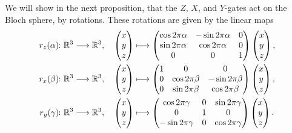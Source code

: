 \documentclass[a4paper, oneside, 12pt]{amsart}
\begin{document}
We will show in the next proposition, that the \( Z \), \( X \), and \( Y \)-gates act on the Bloch sphere, by rotations.
These rotations are given by the linear maps
\begin{subequations}
  \begin{align}
    r_{z}(\alpha) \from \mathbb{R}^3 &\to \mathbb{R}^3,
    &&
       \begin{pmatrix} x \\ y \\ z \end{pmatrix} \mapsto
       \begin{pmatrix}
         \cos 2\pi \alpha &-\sin 2\pi \alpha &0\\
         \sin 2\pi \alpha &\cos 2\pi \alpha &0\\
         0&0&1
       \end{pmatrix}
       \begin{pmatrix} x \\ y \\ z \end{pmatrix},
    \\
    r_{x}(\beta) \from \mathbb{R}^3 &\to \mathbb{R}^3,
    &&
       \begin{pmatrix} x \\ y \\ z \end{pmatrix} \mapsto
       \begin{pmatrix}
         1&0&0\\
         0&\cos 2\pi \beta &-\sin 2\pi \beta \\
         0&\sin 2\pi \beta &\cos 2\pi \beta
       \end{pmatrix}
       \begin{pmatrix} x \\ y \\ z \end{pmatrix},
    \\
    r_{y}(\gamma) \from \mathbb{R}^3 &\to \mathbb{R}^3,
    &&
       \begin{pmatrix} x \\ y \\ z \end{pmatrix} \mapsto
       \begin{pmatrix}
         \cos 2\pi \gamma &0&\sin 2\pi \gamma \\
         0&1&0\\
         -\sin 2\pi \gamma &0&\cos 2\pi \gamma
       \end{pmatrix}
       \begin{pmatrix} x \\ y \\ z \end{pmatrix}.
  \end{align}
\end{subequations}
\end{document}
